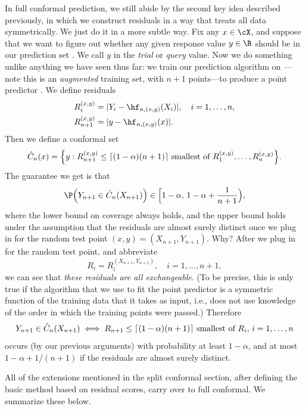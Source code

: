 \documentclass{article}
\begin{document}
In full conformal prediction, we still abide by the second key idea described
previously, in which we construct residuals in a way that treats all data
symmetrically. We just do it in a more subtle way. Fix any $x \in \cX$, and
suppose that we want to figure out whether any given response value $y \in \R$
should be in our prediction set . We call $y$ in the
\emph{trial} or \emph{query} value.  Now we do something unlike anything we have
seen thus far: we train our prediction algorithm on
---note this is an \emph{augmented}  
training set, with $n+1$ points---to produce a point predictor
. We define residuals  
\begin{align*}
R_i^{(x,y)} &= |Y_i-\hf_{n,(x,y)}(X_i)|, \quad i=1,\dots,n, \\
R_{n+1}^{(x,y)} &= |y-\hf_{n,(x,y)}(x)|.
\end{align*}
Then we define a conformal set
\begin{equation}
\label{eq:cset_full}
\hat{C}_n(x) = \Big\{ y : R_{n+1}^{(x,y)} \leq \text{$\lceil (1-\alpha)(n+1) \rceil$
  smallest of $R_1^{(x,y)}, \dots, R_n^{(x,y)}$} \Big\}. 
\end{equation}
The guarantee we get is that 
\begin{equation}
\label{eq:coverage_full}
\P\Big( Y_{n+1} \in \hC_n(X_{n+1}) \Big) \in \Big[ 1-\alpha, \, 1-\alpha +
\frac{1}{n+1} \Big),
\end{equation}
where the lower bound on coverage always holds, and the upper bound holds under
the assumption that the residuals are almost surely distinct once we plug in
for the random test point $(x,y) = (X_{n+1},Y_{n+1})$. Why? After we plug in for
the random test point, and abbreviate
\[
R_i = R_i^{(X_{n+1},Y_{n+1})}, \quad i=1,\dots,n+1,
\]
we can see that \emph{these residuals are all exchangeable}. (To be precise,
this is only true if the algorithm that we use to fit the point predictor
 is a symmetric function of the training data that it
takes as input, i.e., does not use knowledge of the order in which the training
points were passed.) Therefore
\[
Y_{n+1} \in \hat{C}_n(X_{n+1}) 
\iff \text{$R_{n+1} \leq \lceil (1-\alpha)(n+1) \rceil$ smallest of $R_i$,
  $i=1,\dots,n$}
\]
occurs (by our previous arguments) with probability at least $1-\alpha$, and at
most $1-\alpha+1/(n+1)$ if the residuals are almost surely distinct.

All of the extensions mentioned in the split conformal section, after defining
the basic method based on residual scores, carry over to full conformal. We
summarize these below.
\end{document}
